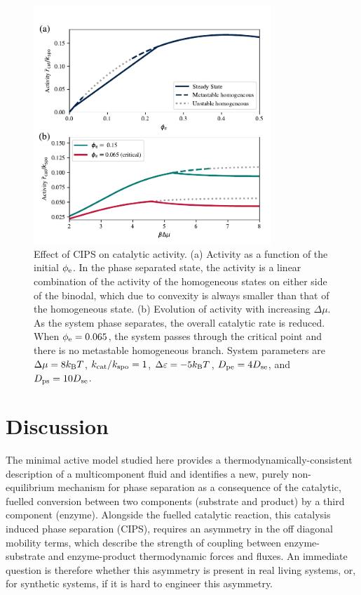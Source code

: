 \begin{figure}
    \centering
    \includegraphics[width=0.8\textwidth]{figures/2-cips-figs/CIPSautoregulation.pdf}
    \caption{Effect of CIPS on catalytic activity. (a) Activity as a function of the initial $\phi_{\mathrm{e}}$. In the phase separated state, the activity is a linear combination of the activity of the homogeneous states on either side of the binodal, which due to convexity is always smaller than that of the homogeneous state. (b) Evolution of activity with increasing $\Delta \mu$. As the system phase separates, the overall catalytic rate is reduced. When $\phi_{\mathrm{e}}=0.065$, the system passes through the critical point and there is no metastable homogeneous branch. System parameters are $\Delta\mu=8 k_{\rm B} T$, $k_{\mathrm{cat}}/k_{\mathrm{spo}}=1$, $\Delta \varepsilon=-5 k_{\rm B} T$, $D_{\mathrm{pe}}=4 D_{\mathrm{se}}$, and $D_{\mathrm{ps}}=10 D_{\mathrm{se}}$.}
    \label{fig:CIPSautoregulation}
\end{figure}

\section{Discussion}

The minimal active model studied here provides a thermodynamically-consistent description of a multicomponent fluid and identifies a new, purely non-equilibrium mechanism for phase separation as a consequence of the catalytic, fuelled conversion between two components (substrate and product) by a third component (enzyme). Alongside the fuelled catalytic reaction, this catalysis induced phase separation (CIPS), requires an asymmetry in the off diagonal mobility terms, which describe the strength of coupling between enzyme-substrate and enzyme-product thermodynamic forces and fluxes. An immediate question is therefore whether this asymmetry is present in real living systems, or, for synthetic systems, if it is hard to engineer this asymmetry.

